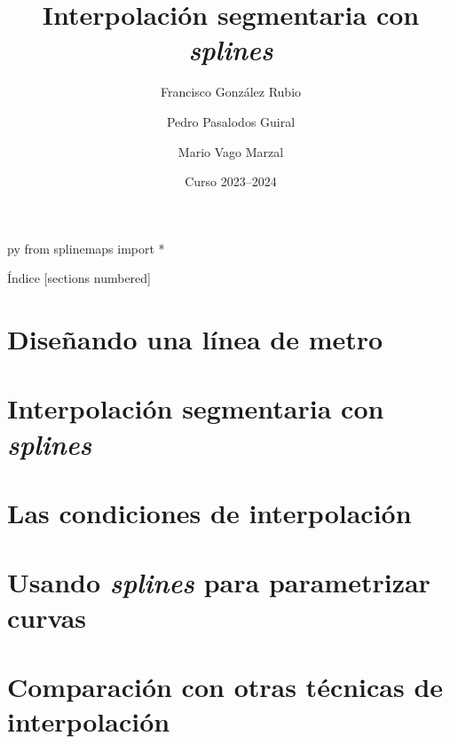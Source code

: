 \documentclass[9pt]{beamer}
\title{Interpolación segmentaria con \textit{splines}}
\subtitle{}
\author{Francisco González Rubio \and Pedro Pasalodos Guiral%
  \and Mario Vago Marzal}
\date{Curso 2023--2024}
\institute{Universitat de València}
\begin{document}
  \begin{pythontexcustomcode}[begin]{py}
    from splinemaps import *
  \end{pythontexcustomcode}

  {
    \vfuzz=16pt
    \maketitle
  }

  \begin{frame}{Índice}
    [sections numbered]
    \tableofcontents
  \end{frame}

  \section{Diseñando una línea de metro}

  \section{Interpolación segmentaria con \textit{splines}}

  \section{Las condiciones de interpolación}



  \section{Usando \textit{splines} para parametrizar curvas}

  \section{Comparación con otras técnicas de interpolación}
\end{document}
